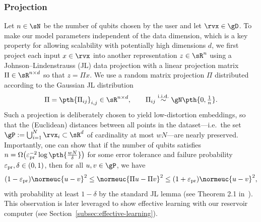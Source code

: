 \subsubsection{Projection}\label{subsubsec:projection} 
Let $n \in \sN$ be the number of qubits chosen by the user and let $\rvx \in \gD$. To make our model parameters independent of the data dimension, which is a key property for allowing scalability with potentially high dimensions $d$, we first project each input $x \in \rvx$ into another representation $z \in \sR^n$ using a Johnson--Lindenstrauss (JL) data projection with a linear projection matrix $\Pi \in \sR^{n \times d}$ so that $z = \Pi x$. We use a random matrix projection $\Pi$ distributed according to the Gaussian JL distribution~\cite{Dasgupta_2002}
\begin{equation}\label{eq:JL-matrix}
    \Pi = \pth{\Pi_{ij}}_{i,j} \in \sR^{n \times d}, \qquad \Pi_{ij} \overset{\mathrm{i.i.d.}}{\sim} \gN\pth{0, \tfrac{1}{n}}.
\end{equation}
Such a projection is deliberately chosen to yield low-distortion embeddings, so that the (Euclidean) distances between all points in the dataset---i.e.\ the set $\gP := \bigcup_{i=1}^N \rvx_i \subset \sR^d$ of cardinality at most $wN$---are nearly preserved. Importantly, one can show that if the number of qubits satisfies $n = \Omega\big(\varepsilon_{\rm pr}^{-2} \log\pth{\tfrac{w N}{\delta}}\big)$ for some error tolerance and failure probability $\varepsilon_{\rm pr}, \delta \in (0,1)$, then for all $u,v \in \gP$, we have
\begin{equation}
    (1-\varepsilon_{\rm pr}) \normeuc{u - v}^2 \leq \normeuc{\Pi u - \Pi v}^2 \leq (1+\varepsilon_{\rm pr}) \normeuc{u - v}^2,
\end{equation}
with probability at least $1-\delta$ by the standard JL lemma (see Theorem 2.1 in~\cite{woodruff2014sketching}). This observation is later leveraged to show effective learning with our reservoir computer (see Section~\ref{subsec:effective-learning}).

